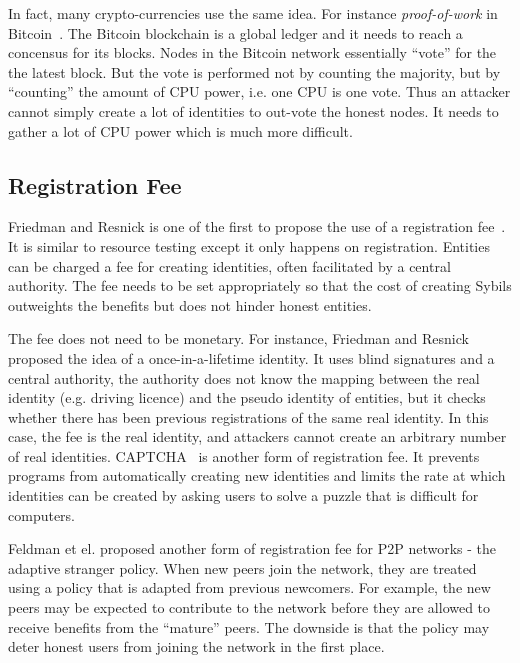 In fact, many crypto-currencies use the same idea. For instance
\emph{proof-of-work} in Bitcoin~\cite{nakamoto2008bitcoin}. The Bitcoin
blockchain is a global ledger and it needs to reach a concensus for its blocks.
Nodes in the Bitcoin network essentially ``vote'' for the the latest block. But
the vote is performed not by counting the majority, but by ``counting'' the
amount of CPU power, i.e. one CPU is one vote. Thus an attacker cannot simply
create a lot of identities to out-vote the honest nodes. It needs to gather a
lot of CPU power which is much more difficult.


\subsection{Registration Fee}\label{sec:registration-fee}

Friedman and Resnick is one of the first to propose the use of a registration
fee~\cite{resnick2001social}. It is similar to resource testing except it only
happens on registration. Entities can be charged a fee for creating identities,
often facilitated by a central authority. The fee needs to be set appropriately
so that the cost of creating Sybils outweights the benefits but does not hinder
honest entities.

The fee does not need to be monetary. For instance, Friedman and Resnick
proposed the idea of a once-in-a-lifetime identity\cite{resnick2001social}. It
uses blind signatures and a central authority, the authority does not know the
mapping between the real identity (e.g. driving licence) and the pseudo identity
of entities, but it checks whether there has been previous registrations of the
same real identity. In this case, the fee is the real identity, and attackers
cannot create an arbitrary number of real identities.
CAPTCHA~\cite{von2003captcha} is another form of registration fee. It prevents
programs from automatically creating new identities and limits the rate at which
identities can be created by asking users to solve a puzzle that is difficult
for computers.

Feldman et el. proposed another form of registration fee for P2P networks - the
adaptive stranger policy\cite{feldman2004robust}. When new peers join the
network, they are treated using a policy that is adapted from previous
newcomers. For example, the new peers may be expected to contribute to the
network before they are allowed to receive benefits from the ``mature'' peers.
The downside is that the policy may deter honest users from joining the network
in the first place.


